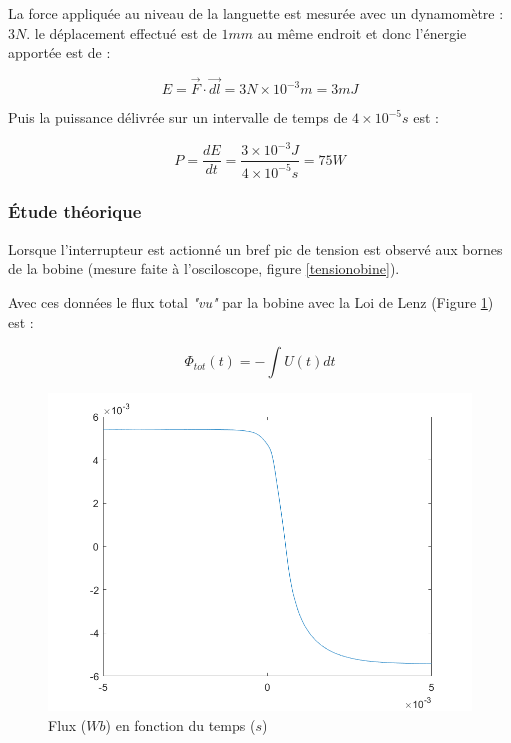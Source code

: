 \documentclass{rapportENS}
\begin{document}
 La force appliquée au niveau de la languette est mesurée avec un dynamomètre : $3N$. le déplacement effectué est de $1mm$ au même endroit et donc l'énergie apportée est de :
 
 \vspace{0.1cm}
 \begin{equation}
     E = \overrightarrow{F}\cdot \overrightarrow{dl} = 3N \times 10^{-3}m = 3mJ
 \end{equation}
 \vspace{0.1cm}
 
 Puis la puissance délivrée sur un intervalle de temps de $4\times 10^{-5} s$ est :
 
 \vspace{0.1cm}
 \begin{equation}
     P = \frac{dE}{dt} = \frac{3\times 10^{-3}J}{4\times 10^{-5}s} = 75W
 \end{equation}
 
 \subsubsection{Étude théorique}
 
 Lorsque l'interrupteur est actionné un bref pic de tension est observé aux bornes de la bobine (mesure faite à l'osciloscope, figure \ref{tensionobine}).
 
 Avec ces données le flux total \textit{"vu"} par la bobine avec la Loi de Lenz (Figure \ref{fluxobine}) est :
 
 \vspace{0.1cm}
 \begin{equation}
 \Phi_{tot}(t) = -\int U(t) dt
 \end{equation}
 
 \begin{figure}[h!]
 \includegraphics[width = .5\linewidth]{flux.png}
 \centering
 \vspace{0.5cm}
 \caption{Flux ($Wb$) en fonction du temps ($s$)}
 \label{fluxobine}
 \end{figure}
 \vspace{0.5cm}
 
\end{document}
